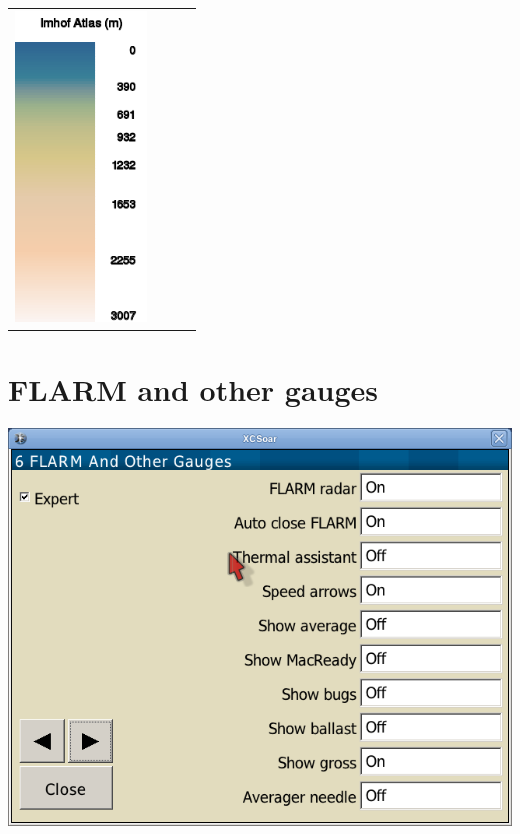 \begin{maxipage}
\begin{longtable}{c c c c}
\includegraphics[angle=0,width=3.5cm,keepaspectratio='true']{figures/ramp-terrain-imhofatlas.png}
\\
\end{longtable}
\end{maxipage}


\clearpage
\section{FLARM and other gauges} \label{sec:vario-gauge}

\begin{center}
\includegraphics[angle=0,width=0.8\linewidth,keepaspectratio='true']{figures/config-othergauges.png}
\end{center}

